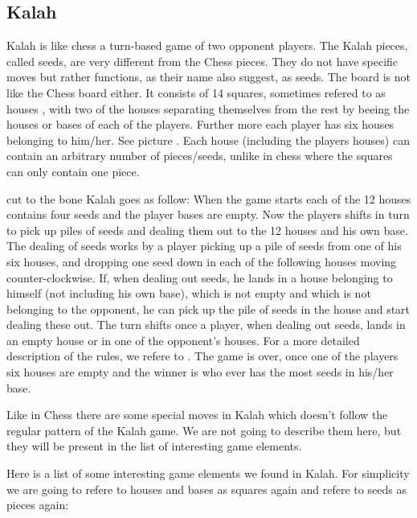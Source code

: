 \subsection{Kalah}

Kalah is like chess a turn-based game of two opponent players. The Kalah pieces, called seeds, are very different from the Chess pieces. They do not have specific moves but rather functions, as their name also suggest, as seeds. The board is not like the Chess board either. It consists of 14 squares, sometimes refered to as houses \cite{kalahrules}, with two of the houses separating themselves from the rest by beeing the houses or bases of each of the players. Further more each player has six houses belonging to him/her. See picture . Each house (including the players houses) can contain an arbitrary number of pieces/seeds, unlike in chess where the squares can only contain one piece.  

cut to the bone Kalah goes as follow: When the game starts each of the 12 houses contains four seeds and the player bases are empty. Now the players shifts in turn to pick up piles of seeds and dealing them out to the 12 houses and his own base. The dealing of seeds works by a player picking up a pile of seeds from one of his six houses, and dropping one seed down in each of the following houses moving counter-clockwise. If, when dealing out seeds, he lands in a house belonging to himself (not including his own base), which is not empty and which is not belonging to the opponent, he can pick up the pile of seeds in the house and start dealing these out. The turn shifts once a player, when dealing out seeds, lands in an empty house or in one of the opponent's houses. For a more detailed description of the rules, we refere to \cite{kalahrules}. The game is over, once one of the players six houses are empty and the winner is who ever has the most seeds in his/her base.

Like in Chess there are some special moves in Kalah which doesn't follow the regular pattern of the Kalah game. We are not going to describe them here, but they will be present in the list of interesting game elements.   


Here is a list of some interesting game elements we found in Kalah. For simplicity we are going to refere to houses and bases as squares again and refere to seeds as pieces again:

